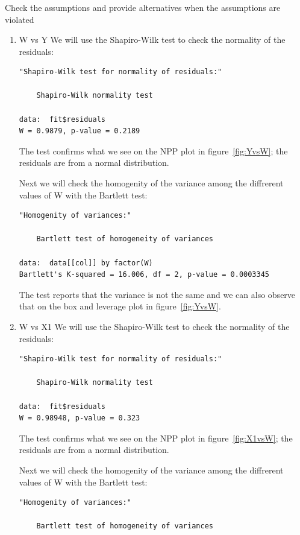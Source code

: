 \documentclass{article}
\begin{document}
\subsubsection{}
Check the assumptions and provide alternatives when the assumptions are violated

\begin{enumerate}
  \item W vs Y
  We will use the Shapiro-Wilk test to check the normality of the residuals:
  \begin{lstlisting}
"Shapiro-Wilk test for normality of residuals:"

	Shapiro-Wilk normality test

data:  fit$residuals
W = 0.9879, p-value = 0.2189
  \end{lstlisting}
  
  The test confirms what we see on the NPP plot in figure~\ref{fig:YvsW}; the
  residuals are from a normal distribution.
  
  Next we will check the homogenity of the variance among the diffrerent values
  of W with the Bartlett test:
  \begin{lstlisting}
"Homogenity of variances:"

	Bartlett test of homogeneity of variances

data:  data[[col]] by factor(W)
Bartlett's K-squared = 16.006, df = 2, p-value = 0.0003345
  \end{lstlisting}
  
  The test reports that the variance is not the same and we can also observe
  that on the box and leverage plot in figure~\ref{fig:YvsW}.
  
  \item W vs X1
  We will use the Shapiro-Wilk test to check the normality of the residuals:
  \begin{lstlisting}
"Shapiro-Wilk test for normality of residuals:"

	Shapiro-Wilk normality test

data:  fit$residuals
W = 0.98948, p-value = 0.323
  \end{lstlisting}
  The test confirms what we see on the NPP plot in figure~\ref{fig:X1vsW}; the
  residuals are from a normal distribution.
  
  Next we will check the homogenity of the variance among the diffrerent values
  of W with the Bartlett test:
  \begin{lstlisting}
"Homogenity of variances:"

	Bartlett test of homogeneity of variances


\end{lstlisting}
\end{enumerate}
\end{document}
